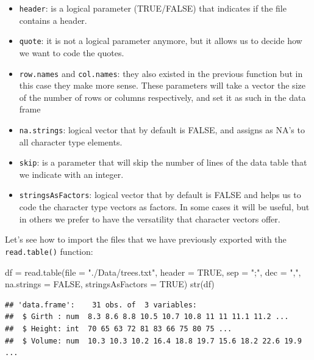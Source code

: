 \documentclass[
]{book}
\newenvironment{Shaded}{\begin{snugshade}}{\end{snugshade}}
\newcommand{\AttributeTok}[1]{\textcolor[rgb]{0.77,0.63,0.00}{#1}}
\newcommand{\ConstantTok}[1]{\textcolor[rgb]{0.00,0.00,0.00}{#1}}
\newcommand{\FunctionTok}[1]{\textcolor[rgb]{0.00,0.00,0.00}{#1}}
\newcommand{\NormalTok}[1]{#1}
\newcommand{\OtherTok}[1]{\textcolor[rgb]{0.56,0.35,0.01}{#1}}
\newcommand{\StringTok}[1]{\textcolor[rgb]{0.31,0.60,0.02}{#1}}
\providecommand{\tightlist}{%
  \setlength{\itemsep}{0pt}\setlength{\parskip}{0pt}}
\theoremstyle{definition}
\theoremstyle{definition}
\theoremstyle{definition}
\theoremstyle{definition}
\theoremstyle{remark}
\begin{document}
\begin{itemize}
\tightlist
\item
  \texttt{header}: is a logical parameter (TRUE/FALSE) that indicates if the file contains a header.
\item
  \texttt{quote}: it is not a logical parameter anymore, but it allows us to decide how we want to code the quotes.
\item
  \texttt{row.names} and \texttt{col.names}: they also existed in the previous function but in this case they make more sense. These parameters will take a vector the size of the number of rows or columns respectively, and set it as such in the data frame
\item
  \texttt{na.strings}: logical vector that by default is FALSE, and assigns as NA's to all character type elements.
\item
  \texttt{skip}: is a parameter that will skip the number of lines of the data table that we indicate with an integer.
\item
  \texttt{stringsAsFactors}: logical vector that by default is FALSE and helps us to code the character type vectors as factors. In some cases it will be useful, but in others we prefer to have the versatility that character vectors offer.
\end{itemize}

Let's see how to import the files that we have previously exported with the \texttt{read.table()} function:

\begin{Shaded}
\begin{Highlighting}[]
\NormalTok{df }\OtherTok{=} \FunctionTok{read.table}\NormalTok{(}\AttributeTok{file =} \StringTok{"./Data/trees.txt"}\NormalTok{, }\AttributeTok{header =} \ConstantTok{TRUE}\NormalTok{, }\AttributeTok{sep =} \StringTok{";"}\NormalTok{, }\AttributeTok{dec =} \StringTok{","}\NormalTok{, }
                \AttributeTok{na.strings =} \ConstantTok{FALSE}\NormalTok{, }\AttributeTok{stringsAsFactors =} \ConstantTok{TRUE}\NormalTok{)}
\FunctionTok{str}\NormalTok{(df)}
\end{Highlighting}
\end{Shaded}

\begin{verbatim}
## 'data.frame':    31 obs. of  3 variables:
##  $ Girth : num  8.3 8.6 8.8 10.5 10.7 10.8 11 11 11.1 11.2 ...
##  $ Height: int  70 65 63 72 81 83 66 75 80 75 ...
##  $ Volume: num  10.3 10.3 10.2 16.4 18.8 19.7 15.6 18.2 22.6 19.9 ...
\end{verbatim}
\end{document}
